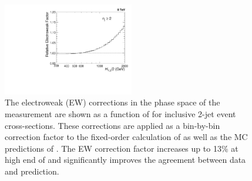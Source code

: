 \begin{figure}[!t]
 \begin{center}
 \includegraphics[width=0.51\textwidth]{Plots_HT_2_150/EW_2.pdf}
 \caption[The electroweak (EW) corrections as a function of \httwo.]{The electroweak (EW) corrections \cite{Dittmaier:2012kx} in the phase space of the measurement are shown as a function of \httwo for inclusive 2-jet event cross-sections. These corrections are applied as a bin-by-bin correction factor to the fixed-order calculation of \NLOJETPP as well as the MC predictions of \MadGraphFn\plusn \PYTHIAS. The EW correction factor increases up to 13\% at high end of \httwo and significantly improves the agreement between data and prediction.}
 \label{fig:EW}
 \end{center}
\end{figure}

